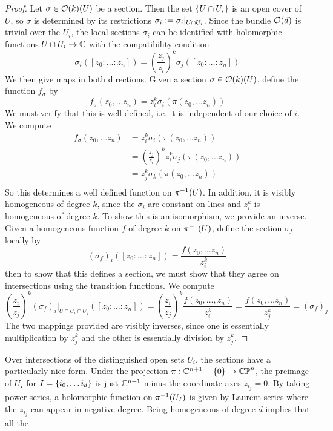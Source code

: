 \begin{proof}
Let $\sigma \in \mathcal{O}(k)(U)$ be a section. Then the set $\left\lbrace U \cap U_i \right\rbrace$ is an
open cover of $U$, so $\sigma$ is determined by its restrictions
$\sigma_i \vcentcolon= \sigma_i\vert_{U \cap U_i}$. Since the bundle $\mathcal{O}(d)$ is trivial
over the $U_i$, the local sections $\sigma_i$ can be identified with holomorphic
functions $U \cap U_i \to \mathbb{C}$ with the compatibility condition
\[
\sigma_i([z_0 :\ldots : z_n])
= \left(\frac{z_j}{z_i}\right)^k\sigma_j([z_0: \ldots : z_n])
\]
We then give maps in both directions. Given a section
$\sigma \in \mathcal{O}(k)(U)$, define the function $f_\sigma$ by
\[
f_\sigma(z_0,\ldots z_n) = z_i^k\sigma_i(\pi(z_0,\ldots z_n))
\]
We must verify that this is well-defined, i.e. it is independent of our choice of $i$.
We compute
\begin{align*}
f_\sigma(z_0,\ldots z_n)
&=  z_i^k\sigma_i(\pi(z_0,\ldots z_n)) \\
&=  \left(\frac{z_j}{z_i}\right)^kz_i^k\sigma_j(\pi(z_0,\ldots z_n)) \\
&= z_j^k\sigma_k(\pi(z_0, \ldots z_n)) \\
\end{align*}
So this determines a well defined function on $\pi^{-1}(U)$. In addition, it is
visibly homogeneous of degree $k$, since the $\sigma_i$ are constant on lines and
$z_i^k$ is homogeneous of degree $k$. To show this is an isomorphism, we provide
an inverse. Given a homogeneous function $f$ of degree $k$ on $\pi^{-1}(U)$, define
the section $\sigma_f$ locally by
\[
(\sigma_f)_i([z_0: \ldots :z_n]) = \frac{f(z_0,\ldots z_n)}{z_i^k}
\]
then to show that this defines a section, we must show that they agree on intersections
using the transition functions. We compute
\[
\left(\frac{z_i}{z_j}\right)^k(\sigma_f)_i\vert_{U \cap U_i \cap U_j}([z_0: \ldots : z_n])
= \left(\frac{z_i}{z_j}\right)^k\frac{f(z_0,\ldots, z_n)}{z_i^k}
= \frac{f(z_0, \ldots z_n)}{z_j^k}
= (\sigma_f)_j
\]
The two mappings provided are visibly inverses, since one is essentially multiplication
by $z_j^k$ and the other is essentially division by $z_j^k$.
\end{proof}
%
Over intersections of the distinguished open sets $U_i$, the sections have
a particularly nice form. Under the projection $\pi : \mathbb{C}^{n+1}-\left\lbrace 0 \right\rbrace \to \mathbb{CP}^n$,
the preimage of $U_I$ for $I = \left\lbrace i_0, \ldots i_d \right\rbrace$ is just $\mathbb{C}^{n+1}$ minus
the coordinate axes $z_{i_j} = 0$. By taking power series, a holomorphic
function on $\pi^{-1}(U_I)$ is given by Laurent series where the $z_{i_j}$ can appear
in negative degree. Being homogeneous of degree $d$ implies that all the
